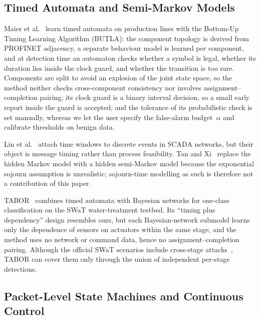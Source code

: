 \documentclass[manuscript,screen,review]{acmart}
\begin{document}
\subsection{Timed Automata and Semi-Markov Models}
\label{sec:rw_timed}

Maier et al.~\cite{maier2011timed} learn timed automata on production lines with the Bottom-Up Timing Learning Algorithm ({BUTLA}): the component topology is derived from {PROFINET} adjacency, a separate behaviour model is learned per component, and at detection time an automaton checks whether a symbol is legal, whether its duration lies inside the clock guard, and whether the transition is too rare. Components are split to avoid an explosion of the joint state space, so the method neither checks cross-component consistency nor involves assignment--completion pairing; its clock guard is a binary interval decision, so a small early report inside the guard is accepted; and the tolerance of its probabilistic check is set manually, whereas we let the user specify the false-alarm budget~$\alpha$ and calibrate thresholds on benign data.

Lin et al.~\cite{lin2018timing} attach time windows to discrete events in {SCADA} networks, but their object is message timing rather than process feasibility. Tan and Xi~\cite{tan2008hsmm} replace the hidden Markov model with a hidden semi-Markov model because the exponential sojourn assumption is unrealistic; sojourn-time modelling as such is therefore not a contribution of this paper.

TABOR~\cite{lin2018tabor} combines timed automata with Bayesian networks for one-class classification on the {SWaT} water-treatment testbed. Its ``timing plus dependency'' design resembles ours, but each Bayesian-network submodel learns only the dependence of sensors on actuators within the same stage, and the method uses no network or command data, hence no assignment--completion pairing. Although the official {SWaT} scenarios include cross-stage attacks~\cite{goh2016swat}, TABOR can cover them only through the union of independent per-stage detections.

\subsection{Packet-Level State Machines and Continuous Control}
\label{sec:rw_packet}
\label{sec:rw_agv}
\end{document}
